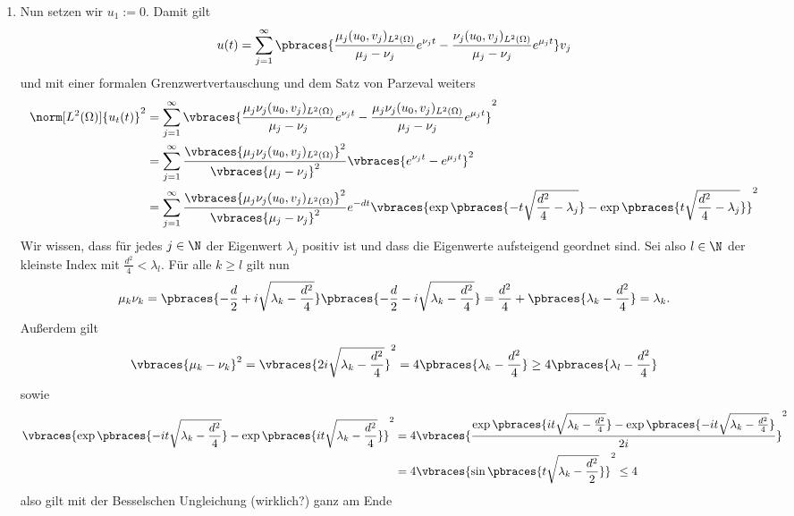 \begin{solution}
\begin{enumerate}[label = (\roman*)]
	\item Nun setzen wir $u_1 := 0$. Damit gilt 
	\begin{align*}
		u(t) = \sum_{j=1}^\infty \pbraces{\frac{\mu_j(u_0, v_j)_{L^2(\Omega)}}{\mu_j - \nu_j} e^{\nu_j t} - \frac{\nu_j(u_0, v_j)_{L^2(\Omega)}}{\mu_j - \nu_j} e^{\mu_j t}} v_j
	\end{align*}
	und mit einer formalen Grenzwertvertauschung und dem Satz von Parzeval weiters
	\begin{align*}
		\norm[L^2(\Omega)]{u_t(t)}^2 &= \sum_{j=1}^\infty \vbraces{\frac{\mu_j\nu_j(u_0, v_j)_{L^2(\Omega)}}{\mu_j - \nu_j} e^{\nu_j t} - \frac{\mu_j\nu_j(u_0, v_j)_{L^2(\Omega)}}{\mu_j - \nu_j} e^{\mu_j t}}^2 \\
		&= \sum_{j=1}^\infty \frac{\vbraces{\mu_j\nu_j(u_0, v_j)_{L^2(\Omega)}}^2}{\vbraces{\mu_j - \nu_j}^2} \vbraces{e^{\nu_j t} - e^{\mu_j t}}^2 \\
		&= \sum_{j=1}^\infty \frac{\vbraces{\mu_j\nu_j(u_0, v_j)_{L^2(\Omega)}}^2}{\vbraces{\mu_j - \nu_j}^2} e^{-d t}\vbraces{\exp\pbraces{-t\sqrt{\frac{d^2}{4} - \lambda_j} } - \exp\pbraces{t\sqrt{\frac{d^2}{4} - \lambda_j} }}^2
	\end{align*}
	Wir wissen, dass für jedes $j \in \N$ der Eigenwert $\lambda_j$ positiv ist und dass die Eigenwerte aufsteigend geordnet sind. Sei also $l \in \N$ der kleinste Index mit $\frac{d^2}{4} < \lambda_l$. Für alle $k \geq l$ gilt nun
	\begin{align*}
		\mu_k \nu_k = \pbraces{-\frac{d}{2} + i \sqrt{\lambda_k - \frac{d^2}{4}}}\pbraces{-\frac{d}{2} - i \sqrt{\lambda_k - \frac{d^2}{4}}} = \frac{d^2}{4} + \pbraces{\lambda_k - \frac{d^2}{4}} = \lambda_k.
	\end{align*}
	Außerdem gilt
	\begin{align*}
		\vbraces{\mu_k - \nu_k}^2 = \vbraces{2 i \sqrt{\lambda_k - \frac{d^2}{4}}}^2 = 4 \pbraces{\lambda_k - \frac{d^2}{4}} \geq 4 \pbraces{\lambda_l - \frac{d^2}{4}}
	\end{align*}
	sowie
	\begin{align*}
		\vbraces{\exp\pbraces{-i t \sqrt{\lambda_k - \frac{d^2}{4}} } - \exp\pbraces{i t \sqrt{\lambda_k - \frac{d^2}{4}} }}^2 &= 4 \vbraces{\frac{\exp\pbraces{i t \sqrt{\lambda_k - \frac{d^2}{4}}} - \exp\pbraces{-i t \sqrt{\lambda_k - \frac{d^2}{4}} }}{2i}}^2  \\
		&= 4 \vbraces{\sin\pbraces{t \sqrt{\lambda_k - \frac{d^2}{2}}}}^2 \leq 4
	\end{align*}
	also gilt mit der Besselschen Ungleichung (wirklich?) ganz am Ende

\end{enumerate}
\end{solution}

